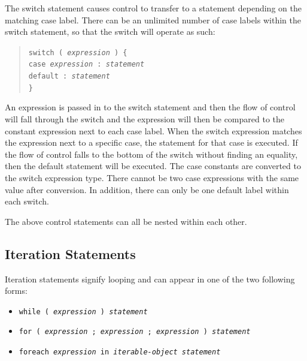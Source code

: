 \documentclass{article}
\begin{document}
The switch statement causes control to transfer to a statement depending on the
matching case label. There can be an unlimited number of case labels within the
switch statement, so that the switch will operate as such:

\begin{quotation}
  \tt switch ( \rm \emph{expression} \tt ) \{\\
  \indent \indent \tt case \rm \emph{expression} \tt : \emph{statement} \\
  \indent \indent \tt default : \rm \emph{statement} \\
  \indent \tt \}
\end{quotation}

An expression is passed in to the switch statement and then the flow of control
will fall through the switch and the expression will then be compared to the
constant expression next to each case label. When the switch expression matches the
expression next to a specific case, the statement for that case is executed. If the
flow of control falls to the bottom of the switch without finding an equality, then
the default statement will be executed. The case constants are converted to the
switch expression type. There cannot be two case expressions with the same value
after conversion. In addition, there can only be one default label within each
switch.

The above control statements can all be nested within each other.


\subsection{Iteration Statements} %
\label{sub:iteration_statements}

Iteration statements signify looping and can appear in one of the two following
forms:

\begin{itemize}
  \item[] \tt while ( \rm \emph{expression} \tt ) \rm \emph{statement}
  \item[] \tt for ( \rm \emph{expression} \tt ; \rm \emph{expression} \tt ; \rm \emph{expression} \tt ) \rm \emph{statement}
  \item[] \tt foreach \rm \emph{expression} \tt in \rm \emph{iterable-object statement}
\end{itemize}

                                                                                                
\end{document}
